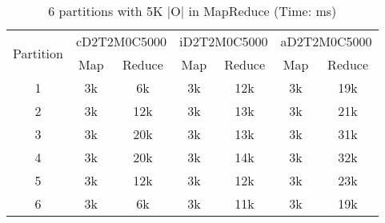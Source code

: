 \begin{table*}[t]
  \centering
\makeatletter
    \long{}
\makeatother
  \caption{6 partitions with 5K |O| in MapReduce (Time: ms)}
    \vspace*{3pt}
  \footnotesize

  \label{table:partition6}
  \begin{tabular}{|c||c|c|c|c|c|c|}
  \hline
  \multirow{2}{*}{Partition} &  \multicolumn{2}{|c|}{cD2T2M0C5000} & \multicolumn{2}{|c|}{iD2T2M0C5000} &\multicolumn{2}{|c|}{aD2T2M0C5000} \\\cline{2-7}
    &  Map & Reduce & Map & Reduce & Map & Reduce \\\hline\hline


\cline{2-7}
    1 &  3k & 6k & 3k & 12k & 3k & 19k \\\hline

\cline{2-7}
    2 &  3k & 12k & 3k & 13k & 3k & 21k \\\hline

\cline{2-7}
    3 &  3k & 20k & 3k & 13k & 3k & 31k  \\\hline

\cline{2-7}
    4 &  3k & 20k & 3k & 14k & 3k & 32k  \\\hline

\cline{2-7}
    5 &  3k & 12k & 3k & 12k & 3k & 23k  \\\hline

\cline{2-7}
    6 &  3k & 6k & 3k & 11k & 3k & 19k  \\\hline

  \end{tabular}
  \vspace*{-17pt}
\end{table*}




